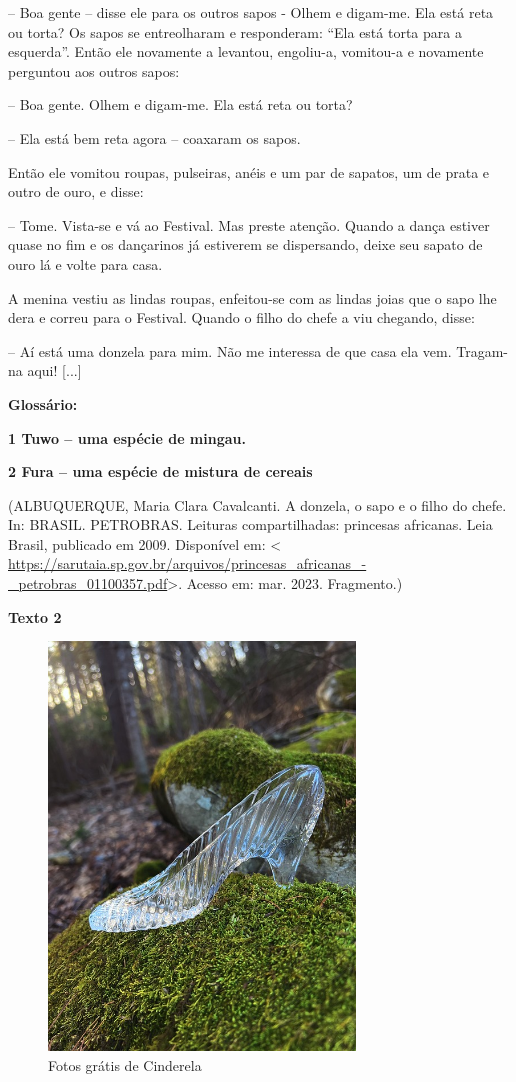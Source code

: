 {-- Boa gente -- disse ele para os outros sapos - Olhem e digam-me. Ela
está reta ou torta? Os sapos se entreolharam e responderam: ``Ela está
torta para a esquerda''. Então ele novamente a levantou, engoliu-a,
vomitou-a e novamente perguntou aos outros sapos:

-- Boa gente. Olhem e digam-me. Ela está reta ou torta?

-- Ela está bem reta agora -- coaxaram os sapos.

Então ele vomitou roupas, pulseiras, anéis e um par de sapatos, um de
prata e outro de ouro, e disse:

-- Tome. Vista-se e vá ao Festival. Mas preste atenção. Quando a dança
estiver quase no fim e os dançarinos já estiverem se dispersando, deixe
seu sapato de ouro lá e volte para casa.

A menina vestiu as lindas roupas, enfeitou-se com as lindas joias que o
sapo lhe dera e correu para o Festival. Quando o filho do chefe a viu
chegando, disse:

-- Aí está uma donzela para mim. Não me interessa de que casa ela vem.
Tragam-na aqui! {[}...{]}

\textbf{Glossário:}

\textbf{1 Tuwo -- uma espécie de mingau.}

\textbf{2 Fura -- uma espécie de mistura de cereais}

(ALBUQUERQUE, Maria Clara Cavalcanti. A donzela, o sapo e o filho do
chefe. In: BRASIL. PETROBRAS. Leituras compartilhadas: princesas
africanas. Leia Brasil, publicado em 2009. Disponível em: \textless{}
\url{https://sarutaia.sp.gov.br/arquivos/princesas_africanas_-_petrobras_01100357.pdf}\textgreater.
Acesso em: mar. 2023. Fragmento.)

\textbf{Texto 2}

\begin{figure}
\centering
\includegraphics[width=3.20455in,height=4.27009in]{./imgSAEB_6_POR/media/image9.jpeg}
\caption{Fotos grátis de Cinderela}
\end{figure}

}
